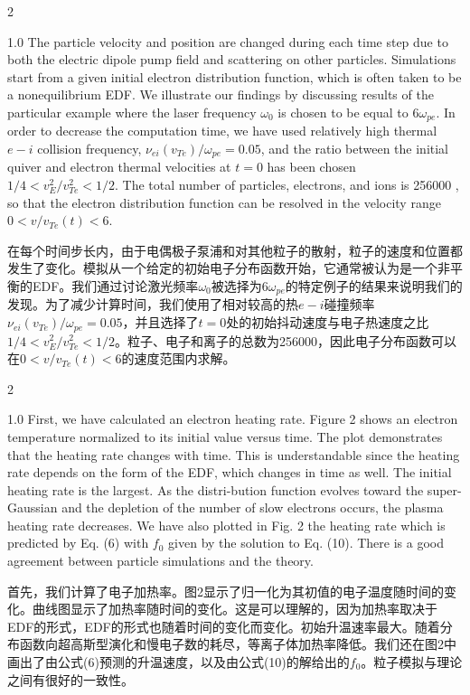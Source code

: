 \documentclass[oneside,onecolumn]{article}
\newcommand\enzhbox[2]{
	\quad\par \begin{paracol}{2} 
			\begin{spacing}{1.0}
					\footnotesize  #1
			\end{spacing}
			
		\switchcolumn[1] 
		#2
	\end{paracol} 
}
\begin{document}
\begin{sloppypar}
\enzhbox{  The particle velocity and position are changed during each time step due to both the electric dipole pump field and scattering on other particles. Simulations start from a given initial electron distribution function, which is often taken to be a nonequilibrium EDF. We illustrate our findings by discussing results of the particular example where the laser frequency $\omega_{0}$ is chosen to be equal to $6 \omega_{p e}$. In order to decrease the computation time, we have used relatively high thermal $e-i$ collision frequency, $\nu_{e i}\left(v_{T e}\right) / \omega_{p e}=0.05$, and the ratio between the initial quiver and electron thermal velocities at $t=0$ has been chosen $1 / 4<v_{E}^{2} / v_{T e}^{2}<1 / 2$. The total number of particles, electrons, and ions is 256000 , so that the electron distribution function can be resolved in the velocity range $0<v / v_{T e}(t)<6$.
}{
在每个时间步长内，由于电偶极子泵浦和对其他粒子的散射，粒子的速度和位置都发生了变化。模拟从一个给定的初始电子分布函数开始，它通常被认为是一个非平衡的EDF。我们通过讨论激光频率$\omega_{0}$被选择为$6 \omega_{p e}$的特定例子的结果来说明我们的发现。为了减少计算时间，我们使用了相对较高的热$e-i$碰撞频率$\nu_{e i}\left(v_{T e}\right) / \omega_{p e}=0.05$，并且选择了$t=0$处的初始抖动速度与电子热速度之比$1 / 4<v_{E}^{2} / v_{T e}^{2}<1 / 2$。粒子、电子和离子的总数为256000，因此电子分布函数可以在$0<v / v_{T e}(t)<6$的速度范围内求解。
}
  

\enzhbox{  First, we have calculated an electron heating rate. Figure 2 shows an electron temperature normalized to its initial value versus time. The plot demonstrates that the heating rate changes with time. This is understandable since the heating rate depends on the form of the EDF, which changes in time as well. The initial heating rate is the largest. As the distri-bution function evolves toward the super-Gaussian and the depletion of the number of slow electrons occurs, the plasma heating rate decreases. We have also plotted in Fig. 2 the heating rate which is predicted by Eq. (6) with $f_{0}$ given by the solution to Eq. (10). There is a good agreement between particle simulations and the theory.
}{
首先，我们计算了电子加热率。图2显示了归一化为其初值的电子温度随时间的变化。曲线图显示了加热率随时间的变化。这是可以理解的，因为加热率取决于EDF的形式，EDF的形式也随着时间的变化而变化。初始升温速率最大。随着分布函数向超高斯型演化和慢电子数的耗尽，等离子体加热率降低。我们还在图2中画出了由公式(6)预测的升温速度，以及由公式(10)的解给出的$f_{0}$。粒子模拟与理论之间有很好的一致性。
}
  

\end{sloppypar}
\end{document}
